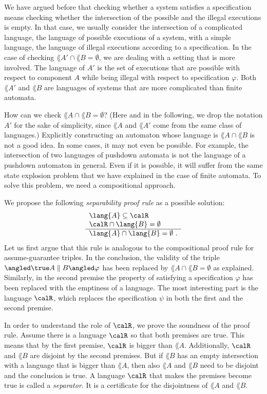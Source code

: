 \documentclass[../../diss.tex]{subfiles}
\begin{document}
We have argued before that checking whether a system satisfies a specification means checking whether the intersection of the possible and the illegal executions is empty.
In that case, we usually consider the intersection of a complicated language, the language of possible executions of a system, with a simple language, the language of illegal executions according to a specification.
In the case of checking $\lang{A'} \cap \lang{B} = \emptyset$, we are dealing with a setting that is more involved.
The language of $A'$ is the set of executions that are possible with respect to component $A$ while being illegal with respect to specification $\varphi$.
Both $\lang{A'}$ and $\lang{B}$ are languages of systems that are more complicated than finite automata.

How can we check $\lang{A} \cap \lang{B} = \emptyset$?
(Here and in the following, we drop the notation $A'$ for the sake of simplicity, since $\lang{A}$ and $\lang{A'}$ come from the same class of languages.)
Explicitly constructing an automaton whose language is $\lang{A} \cap \lang{B}$ is not a good idea.
In some cases, it may not even be possible.
For example, the intersection of two languages of pushdown automata is not the language of a pushdown automaton in general.
Even if it is possible, it will suffer from the same state explosion problem that we have explained in the case of finite automata.
To solve this problem, we need a compositional approach.

We propose the following \emph{separability proof rule} as a possible solution:
\[
    \begin{array}{l}
        \lang{A} \subseteq \calR
        \\
        \calR \cap \lang{B} = \emptyset
        \\
        \hline
        \lang{A} \cap \lang{B} = \emptyset
        \ .
    \end{array}
\]
Let us first argue that this rule is analogous to the compositional proof rule for assume-guarantee triples.
In the conclusion, the validity of the triple $\agtriple{\true}{A \parcomp B}{\varphi}$ has been replaced by $\lang{A} \cap \lang{B} = \emptyset$ as explained.
Similarly, in the second premise the property of satisfying a specification $\varphi$ has been replaced with the emptiness of a language.
The most interesting part is the language $\calR$, which replaces the specification $\psi$ in both the first and the second premise.

In order to understand the role of $\calR$, we prove the soundness of the proof rule.
Assume there is a language $\calR$ so that both premises are true.
This means that by the first premise, $\calR$ is bigger than $\lang{A}$.
Additionally, $\calR$ and $\lang{B}$ are disjoint by the second premises.
But if $\lang{B}$ has an empty intersection with a language that is bigger than $\lang{A}$, then also $\lang{A}$ and $\lang{B}$ need to be disjoint and the conclusion is true.
A language $\calR$ that makes the premises become true is called a \emph{separator}.
It is a certificate for the disjointness of $\lang{A}$ and $\lang{B}$.
\end{document}
